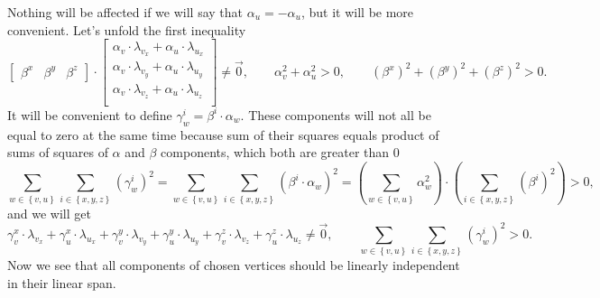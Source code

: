 Nothing will be affected if we will say that $\alpha_u = - \alpha_u$,
but it will be more convenient.
Let's unfold the first inequality
\begin{equation*}
  \begin{bmatrix}
    \beta^x & \beta^y & \beta^z
  \end{bmatrix}
  \cdot \begin{bmatrix}
    \alpha_v \cdot \lambda_{v_x} + \alpha_u \cdot \lambda_{u_x} \\
    \alpha_v \cdot \lambda_{v_y} + \alpha_u \cdot \lambda_{u_y} \\
    \alpha_v \cdot \lambda_{v_z} + \alpha_u \cdot \lambda_{u_z} \\
  \end{bmatrix}
  \neq \vec{0},
  \qquad \alpha_v^2 + \alpha_u^2 > 0,
  \qquad \left( \beta^x \right)^2
    + \left( \beta^y \right)^2
    + \left( \beta^z \right)^2 > 0.
\end{equation*}
It will be convenient to define $\gamma_w^i = \beta^i \cdot \alpha_w$.
These components will not all be equal to zero at the same time because
sum of their squares equals product of sums of squares
of $\alpha$ and $\beta$ components, which both are greater than $0$
\begin{equation*}
  \sum_{w \in \left\{ v, u \right\}}
  \sum_{i \in \left\{ x, y, z \right\}}
    \left( \gamma_w^i \right)^2
  =
  \sum_{w \in \left\{ v, u \right\}}
  \sum_{i \in \left\{ x, y, z \right\}}
    \left( \beta^i \cdot \alpha_w \right)^2
  =
  \left( \sum_{w \in \left\{ v, u \right\}} \alpha_w^2 \right)
  \cdot
  \left( \sum_{i \in \left\{ x, y, z \right\}} \left( \beta^i \right)^2 \right)
  > 0,
\end{equation*}
and we will get
\begin{equation}\label{eq:components:independent}
  \gamma_v^x \cdot \lambda_{v_x}
  + \gamma_u^x \cdot \lambda_{u_x}
  + \gamma_v^y \cdot \lambda_{v_y}
  + \gamma_u^y \cdot \lambda_{u_y}
  + \gamma_v^z \cdot \lambda_{v_z}
  + \gamma_u^z \cdot \lambda_{u_z}
  \neq \vec{0},
  \qquad
    \sum_{w \in \left\{ v, u \right\}}
    \sum_{i \in \left\{ x, y, z \right\}}
      \left( \gamma_w^i \right)^2 > 0.
\end{equation}
Now we see that all components of chosen vertices
should be linearly independent in their linear span.

